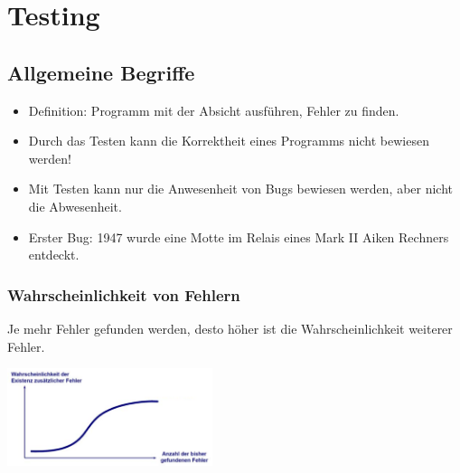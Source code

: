 \section{Testing}
\subsection{Allgemeine Begriffe}
\begin{itemize}
	\item Definition: Programm mit der Absicht ausführen, Fehler zu finden. 
	\item Durch das Testen kann die Korrektheit eines Programms nicht bewiesen werden!
	\item Mit Testen kann nur die Anwesenheit von Bugs bewiesen werden, aber nicht die Abwesenheit. 
	\item Erster Bug: 1947 wurde eine Motte im Relais eines Mark II Aiken Rechners entdeckt.
\end{itemize}

\subsubsection{Wahrscheinlichkeit von Fehlern}
\begin{minipage}{12cm}
Je mehr Fehler gefunden werden, desto höher ist die Wahrscheinlichkeit weiterer Fehler.
\end{minipage}
\begin{minipage}{6cm}
	\includegraphics[width=6cm]{images/fehler_wkeit.png}	
\end{minipage}

